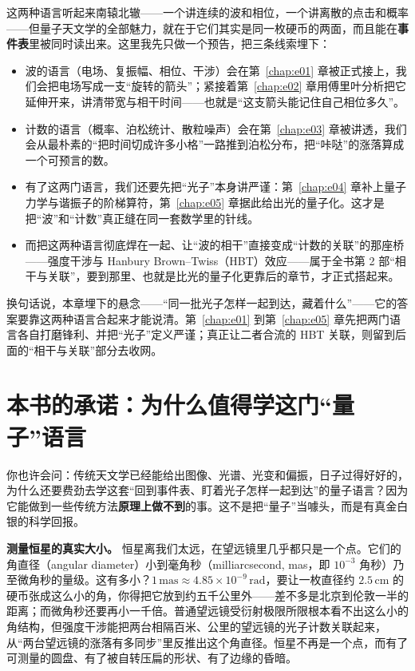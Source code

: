 这两种语言听起来南辕北辙——一个讲连续的波和相位，一个讲离散的点击和概率——但量子天文学的全部魅力，就在于它们其实是同一枚硬币的两面，而且能在\textbf{事件表}里被同时读出来。这里我先只做一个预告，把三条线索埋下：

\begin{itemize}
  \item 波的语言（电场、复振幅、相位、干涉）会在第~\ref{chap:e01} 章被正式接上，我们会把电场写成一支“旋转的箭头”；紧接着第~\ref{chap:e02} 章用傅里叶分析把它延伸开来，讲清带宽与相干时间——也就是“这支箭头能记住自己相位多久”。
  \item 计数的语言（概率、泊松统计、散粒噪声）会在第~\ref{chap:e03} 章被讲透，我们会从最朴素的“把时间切成许多小格”一路推到泊松分布，把“咔哒”的涨落算成一个可预言的数。
  \item 有了这两门语言，我们还要先把“光子”本身讲严谨：第~\ref{chap:e04} 章补上量子力学与谐振子的阶梯算符，第~\ref{chap:e05} 章据此给出光的量子化。这才是把“波”和“计数”真正缝在同一套数学里的针线。
  \item 而把这两种语言彻底焊在一起、让“波的相干”直接变成“计数的关联”的那座桥——强度干涉与 Hanbury Brown--Twiss（HBT）效应——属于全书第 2 部“相干与关联”，要到那里、也就是比光的量子化更靠后的章节，才正式搭起来。
\end{itemize}

换句话说，本章埋下的悬念——“同一批光子怎样一起到达，藏着什么”——它的答案要靠这两种语言合起来才能说清。第~\ref{chap:e01} 到第~\ref{chap:e05} 章先把两门语言各自打磨锋利、并把“光子”定义严谨；真正让二者合流的 HBT 关联，则留到后面的“相干与关联”部分去收网。

\section{本书的承诺：为什么值得学这门“量子”语言}
\label{sec:e00-promise}

你也许会问：传统天文学已经能给出图像、光谱、光变和偏振，日子过得好好的，为什么还要费劲去学这套“回到事件表、盯着光子怎样一起到达”的量子语言？因为它能做到一些传统方法\textbf{原理上做不到}的事。这不是把“量子”当噱头，而是有真金白银的科学回报。

\textbf{测量恒星的真实大小。} 恒星离我们太远，在望远镜里几乎都只是一个点。它们的角直径（angular diameter）小到毫角秒（milliarcsecond, mas，即 \(10^{-3}\) 角秒）乃至微角秒的量级。这有多小？\(1\,\mathrm{mas}\approx4.85\times10^{-9}\,\mathrm{rad}\)，要让一枚直径约 \(2.5\,\mathrm{cm}\) 的硬币张成这么小的角，你得把它放到约五千公里外——差不多是北京到伦敦一半的距离；而微角秒还要再小一千倍。普通望远镜受衍射极限所限根本看不出这么小的角结构，但强度干涉能把两台相隔百米、公里的望远镜的光子计数关联起来，从“两台望远镜的涨落有多同步”里反推出这个角直径。恒星不再是一个点，而有了可测量的圆盘、有了被自转压扁的形状、有了边缘的昏暗。

